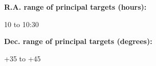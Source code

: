 \documentclass[12pt]{article}
\begin{document}


{\par\bf R.A. range of principal targets (hours): }10 to 10:30
{\par\bf Dec. range of principal targets (degrees): }+35 to +45

\pagebreak
\end{document}
